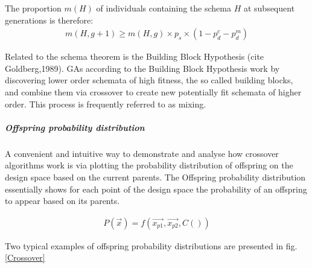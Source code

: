 The proportion $m(H)$ of individuals containing the schema $H$ at subsequent generations is therefore:
\begin{eqnarray}
   m(H,g+1)\geq m(H,g)\times p_s \times (1-p_d^c-p_d^m) 
   \label{Schema} 
\end{eqnarray}

Related to the schema theorem is the Building Block Hypothesis (cite Goldberg,1989). GAs according to the Building Block Hypothesis work by discovering lower order schemata of high fitness, the so called building blocks, and combine them via crossover to create new potentially fit schemata of higher order. This process is frequently referred to as mixing.

\subparagraph{Offspring probability distribution} 
A convenient and intuitive way to demonstrate and analyse how crossover algorithms work is via plotting the probability distribution of offspring on the design space based on the current parents. The Offspring probability distribution essentially shows for each point of the design space the probability of an offspring to appear based on its parents.

\begin{eqnarray}
	P(\overrightarrow{x})=f(\overrightarrow{x_{p1}},\overrightarrow{x_{p2}},C())    
    \label{prob_eq} 
\end{eqnarray}


Two typical examples of offspring probability distributions are presented in fig. \ref{Crossover}



